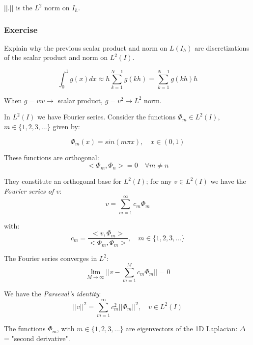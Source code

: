 $||.||$ is the $L^2$ norm on $I_h$.

\subsubsection{Exercise}
Explain why the previous scalar product and norm on $L(I_h)$ are discretizations of the scalar product and norm on $L^2(I)$.

\begin{equation*}
\int_{0}^{1} g(x) dx \approx h \sum_{k=1}^{N-1} g(kh) = \sum_{k=1}^{N-1} g(kh) h
\end{equation*}

When $g = v w \rightarrow $ scalar product, $g = v^2 \rightarrow L^2$ norm.

In $L^2(I)$ we have Fourier series. Consider the functions $\Phi_m \in L^2(I)$, $m \in \{1, 2, 3, \dots \}$ given by:

\begin{equation*}
\Phi_m(x) = sin(m \pi x), \quad x \in (0, 1)
\end{equation*}

These functions are orthogonal:
\begin{equation*}
<\Phi_m, \Phi_n> = 0 \quad \forall m \neq n
\end{equation*}

They constitute an orthogonal base for $L^2(I)$; for any $v \in L^2(I)$ we have the \textit{Fourier series of $v$}:
\begin{equation*}
v = \sum_{m=1}^{\infty} c_m \Phi_m
\end{equation*}

with:
\begin{equation*}
c_m = \frac{<v, \Phi_m>}{<\Phi_m, \Phi_m>}, \quad m \in \{1, 2, 3, \dots \}
\end{equation*}

The Fourier series converges in $L^2$:
\begin{equation*}
\lim_{M \rightarrow \infty} || v - \sum_{m = 1}^{M} c_m \Phi_m || = 0
\end{equation*}

We have the \textit{Parseval's identity}:
\begin{equation*}
|| v ||^2 = \sum_{m = 1}^\infty c_m^2 || \Phi_m ||^2, \quad v \in L^2(I)
\end{equation*}

The functions $\Phi_m$, with $m \in \{1, 2, 3, \dots\}$ are eigenvectors of the 1D Laplacian: $\Delta$ = "second derivative".

